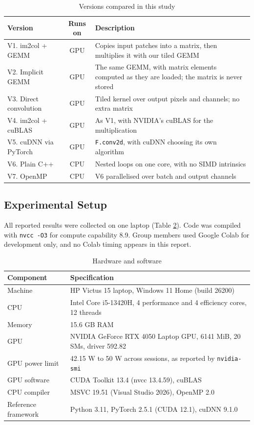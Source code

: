 \documentclass[12pt,a4paper]{article}
\begin{document}
\begin{table}[H]\centering\small
\begin{tabular}{p{4.1cm}cp{7.6cm}}
\hline
\rowcolor{headgrey}\textbf{Version} & \textbf{Runs on} & \textbf{Description} \\ \hline
V1. im2col + GEMM & GPU & Copies input patches into a matrix, then multiplies it with our tiled GEMM \\
V2. Implicit GEMM & GPU & The same GEMM, with matrix elements computed as they are loaded; the matrix is never stored \\
V3. Direct convolution & GPU & Tiled kernel over output pixels and channels; no extra matrix \\
V4. im2col + cuBLAS & GPU & As V1, with NVIDIA's cuBLAS for the multiplication \\
V5. cuDNN via PyTorch & GPU & \texttt{F.conv2d}, with cuDNN choosing its own algorithm \\
V6. Plain C++ & CPU & Nested loops on one core, with no SIMD intrinsics \\
V7. OpenMP & CPU & V6 parallelised over batch and output channels \\
\hline
\end{tabular}
\caption{Versions compared in this study}\label{tab:versions}
\end{table}

\subsection{Experimental Setup}
All reported results were collected on one laptop (Table \ref{tab:setup}). Code was compiled with \texttt{nvcc -O3} for compute capability 8.9. Group members used Google Colab for development only, and no Colab timing appears in this report.

\begin{table}[H]\centering\small
\begin{tabular}{lp{9.8cm}}
\hline
\rowcolor{headgrey}\textbf{Component} & \textbf{Specification} \\ \hline
Machine & HP Victus 15 laptop, Windows 11 Home (build 26200) \\
CPU & Intel Core i5-13420H, 4 performance and 4 efficiency cores, 12 threads \\
Memory & 15.6 GB RAM \\
GPU & NVIDIA GeForce RTX 4050 Laptop GPU, 6141 MiB, 20 SMs, driver 592.82 \\
GPU power limit & 42.15 W to 50 W across sessions, as reported by \texttt{nvidia-smi} \\
GPU software & CUDA Toolkit 13.4 (nvcc 13.4.59), cuBLAS \\
CPU compiler & MSVC 19.51 (Visual Studio 2026), OpenMP 2.0 \\
Reference framework & Python 3.11, PyTorch 2.5.1 (CUDA 12.1), cuDNN 9.1.0 \\
\hline
\end{tabular}
\caption{Hardware and software}\label{tab:setup}
\end{table}
\end{document}
